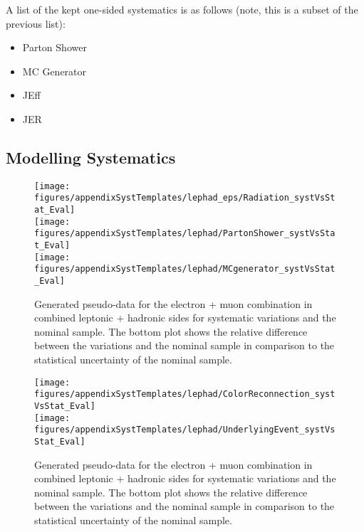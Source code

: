 A list of the kept one-sided systematics is as follows (note, this is a subset of the previous list):
\begin{itemize}
\item Parton Shower
\item MC Generator
\item JEff
\item JER
\end{itemize}

\clearpage
\subsection{Modelling Systematics}

\begin{figure}[!hb]
\begin{center}
        \texttt{[image: figures/appendixSystTemplates/lephad\_eps/Radiation\_systVsStat\_Eval]}\\
        \texttt{[image: figures/appendixSystTemplates/lephad/PartonShower\_systVsStat\_Eval]}\\
        \texttt{[image: figures/appendixSystTemplates/lephad/MCgenerator\_systVsStat\_Eval]}
\caption{Generated pseudo-data for the electron + muon combination in combined leptonic + hadronic sides for systematic variations and the nominal \ttbar sample. The bottom plot shows the relative difference between the variations and the nominal sample in comparison to the statistical uncertainty of the nominal sample.}   
\label{fig:systematicVar_lephad_modelling_1}
\end{center}
\end{figure}

\begin{figure}[!hb]
\begin{center}
        \texttt{[image: figures/appendixSystTemplates/lephad/ColorReconnection\_systVsStat\_Eval]}\\
        \texttt{[image: figures/appendixSystTemplates/lephad/UnderlyingEvent\_systVsStat\_Eval]}
\caption{Generated pseudo-data for the electron + muon combination in combined leptonic + hadronic sides for systematic variations and the nominal \ttbar sample. The bottom plot shows the relative difference between the variations and the nominal sample in comparison to the statistical uncertainty of the nominal sample.}   
\label{fig:systematicVar_lephad_modelling_2}
\end{center}
\end{figure}

